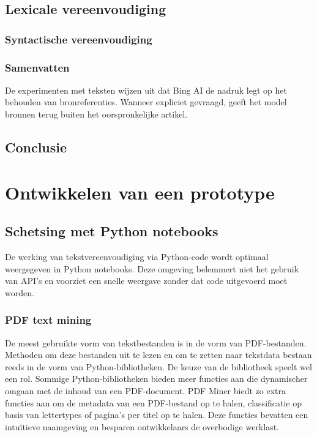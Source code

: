\subsection{Lexicale vereenvoudiging}


\subsubsection{Syntactische vereenvoudiging}


\subsubsection{Samenvatten}


De experimenten met teksten wijzen uit dat Bing AI de nadruk legt op het behouden van bronreferenties. Wanneer expliciet gevraagd, geeft het model bronnen terug buiten het oorspronkelijke artikel. 

\subsection{Conclusie}

\section{Ontwikkelen van een prototype}

\subsection{Schetsing met Python notebooks}

De werking van tekstvereenvoudiging via Python-code wordt optimaal weergegeven in Python notebooks. Deze omgeving belemmert niet het gebruik van API's en voorziet een snelle weergave zonder dat code uitgevoerd moet worden.

\subsubsection{PDF text mining}

De meest gebruikte vorm van tekstbestanden is in de vorm van PDF-bestanden. Methoden om deze bestanden uit te lezen en om te zetten naar tekstdata bestaan reeds in de vorm van Python-bibliotheken. De keuze van de bibliotheek speelt wel een rol. Sommige Python-bibliotheken bieden meer functies aan die dynamischer omgaan met de inhoud van een PDF-document. PDF Miner biedt zo extra functies aan om de metadata van een PDF-bestand op te halen, classificatie op basis van lettertypes of pagina's per titel op te halen. Deze functies bevatten een intuïtieve naamgeving en besparen ontwikkelaars de overbodige werklast.

